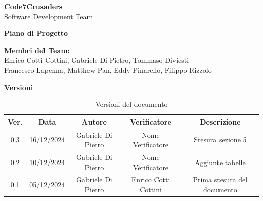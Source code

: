 \documentclass{article}
\begin{document}
\begin{titlepage}
    {\Huge \textbf{Code7Crusaders}}\\
    \vspace{0.5cm}
    {\Large Software Development Team}\\
    \vspace{2cm}
    
    {\large \textbf{Piano di Progetto}}\\
    \vspace{5cm}
    
    
    \textbf{Membri del Team:}\\
    Enrico Cotti Cottini, Gabriele Di Pietro, Tommaso Diviesti \\
    Francesco Lapenna, Matthew Pan, Eddy Pinarello, Filippo Rizzolo \\
    \vspace{0.5cm}
    
    \vspace{1cm}
\end{titlepage}



\begin{table}[h!]
\centering
\textbf{Versioni} \\ %
\vspace{2mm} %
\begin{tabular}{|c|c|c|c|c|}
    \hline
    \textbf{Ver.} & \textbf{Data} & \textbf{Autore} & \textbf{Verificatore} & \textbf{Descrizione} \\
    \hline
    0.3 & 16/12/2024 & Gabriele Di Pietro & Nome Verificatore & Stesura sezione 5 \\
    0.2 & 10/12/2024 & Gabriele Di Pietro & Nome Verificatore & Aggiunte tabelle \\
    0.1 & 05/12/2024 & Gabriele Di Pietro & Enrico Cotti Cottini & Prima stesura del documento \\  
    \hline
\end{tabular}
\caption{Versioni del documento}
\label{tab:versioni}
\end{table}



\tableofcontents
\listoftables
\listoffigures
\end{document}
